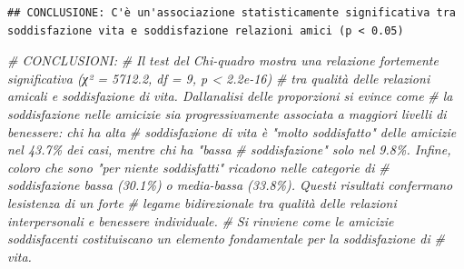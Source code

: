 \documentclass[
]{article}
\newenvironment{Shaded}{\begin{snugshade}}{\end{snugshade}}
\newcommand{\CommentTok}[1]{\textcolor[rgb]{0.56,0.35,0.01}{\textit{#1}}}
\newcommand{\ControlFlowTok}[1]{\textcolor[rgb]{0.13,0.29,0.53}{\textbf{#1}}}
\newcommand{\FloatTok}[1]{\textcolor[rgb]{0.00,0.00,0.81}{#1}}
\newcommand{\FunctionTok}[1]{\textcolor[rgb]{0.13,0.29,0.53}{\textbf{#1}}}
\newcommand{\NormalTok}[1]{#1}
\newcommand{\SpecialCharTok}[1]{\textcolor[rgb]{0.81,0.36,0.00}{\textbf{#1}}}
\newcommand{\StringTok}[1]{\textcolor[rgb]{0.31,0.60,0.02}{#1}}
\begin{document}
\begin{Shaded}
\end{Shaded}

\begin{verbatim}
## CONCLUSIONE: C'è un'associazione statisticamente significativa tra soddisfazione vita e soddisfazione relazioni amici (p < 0.05)
\end{verbatim}

\begin{Shaded}
\begin{Highlighting}[]
\CommentTok{\# CONCLUSIONI:  }
\CommentTok{\# Il test del Chi{-}quadro mostra una relazione fortemente significativa (χ² = 5712.2, df = 9, p \textless{} 2.2e{-}16)}
\CommentTok{\# tra qualità delle relazioni amicali e soddisfazione di vita. Dall\textquotesingle{}analisi delle proporzioni si evince come }
\CommentTok{\# la soddisfazione nelle amicizie sia progressivamente associata a maggiori livelli di benessere: chi ha alta}
\CommentTok{\# soddisfazione di vita è "molto soddisfatto" delle amicizie nel 43.7\% dei casi, mentre chi ha "bassa    }
\CommentTok{\# soddisfazione" solo nel 9.8\%. Infine, coloro che sono "per niente soddisfatti" ricadono nelle categorie di}
\CommentTok{\# soddisfazione bassa (30.1\%) o media{-}bassa (33.8\%). Questi risultati confermano l\textquotesingle{}esistenza di un forte  }
\CommentTok{\# legame bidirezionale tra qualità delle relazioni interpersonali e benessere individuale.}
\CommentTok{\# Si rinviene come le amicizie soddisfacenti costituiscano un elemento fondamentale per la soddisfazione di }
\CommentTok{\# vita.}
\end{Highlighting}
\end{Shaded}
\end{document}
